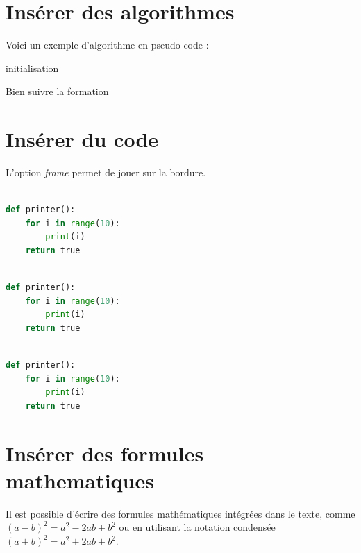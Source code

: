 \documentclass[10pt,a4paper]{report} %
\begin{document}
\section{Insérer des algorithmes}
Voici un exemple d'algorithme en pseudo code : 

\begin{algorithm}[H]
	\SetAlgoLined
	initialisation\;
	\caption{Bien suivre la formation}
\end{algorithm}


\section{Insérer du code}
L'option \emph{frame} permet de jouer sur la bordure.
\begin{lstlisting}[language=Python, frame=L, caption={Une imprimante des premiers nombres},label=monImprimante]  % Start your code-block

def printer():
	for i in range(10):
		print(i)
	return true
\end{lstlisting}

\begin{lstlisting}[language=Python, frame=single, caption={Une seconde imprimante des premiers nombres},label=monImprimante2]  % Start your code-block

def printer():
	for i in range(10):
		print(i)
	return true
\end{lstlisting}

\begin{lstlisting}[language=Python, frame=shadowbox, caption={Une troisième imprimante des premiers nombres},label=monImprimante3]  % Start your code-block

def printer():
	for i in range(10):
		print(i)
	return true
\end{lstlisting}


\section{Insérer des formules mathematiques}
Il est possible d'écrire des formules mathématiques intégrées dans le texte, comme \begin{math}(a-b)^2=a^2-2ab+b^2\end{math} ou en utilisant la notation condensée $(a+b)^2=a^2+2ab+b^2$.
\end{document}
